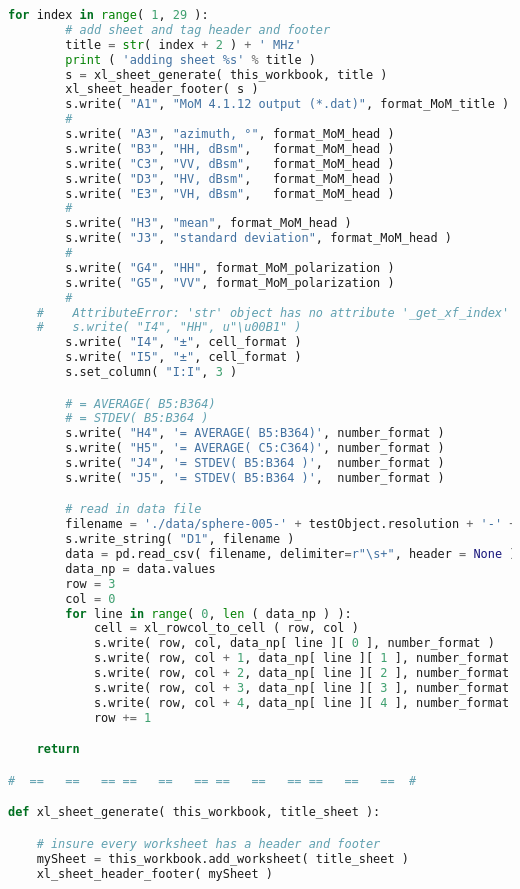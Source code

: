 {{\begin{lstlisting}[language=Python]
    for index in range( 1, 29 ):
        # add sheet and tag header and footer
        title = str( index + 2 ) + ' MHz'
        print ( 'adding sheet %s' % title )
        s = xl_sheet_generate( this_workbook, title )
        xl_sheet_header_footer( s )
        s.write( "A1", "MoM 4.1.12 output (*.dat)", format_MoM_title )
        #
        s.write( "A3", "azimuth, °", format_MoM_head )
        s.write( "B3", "HH, dBsm",   format_MoM_head )
        s.write( "C3", "VV, dBsm",   format_MoM_head )
        s.write( "D3", "HV, dBsm",   format_MoM_head )
        s.write( "E3", "VH, dBsm",   format_MoM_head )
        #
        s.write( "H3", "mean", format_MoM_head )
        s.write( "J3", "standard deviation", format_MoM_head )
        #
        s.write( "G4", "HH", format_MoM_polarization )
        s.write( "G5", "VV", format_MoM_polarization )
        #
    #    AttributeError: 'str' object has no attribute '_get_xf_index'
    #    s.write( "I4", "HH", u"\u00B1" )
        s.write( "I4", "±", cell_format )
        s.write( "I5", "±", cell_format )
        s.set_column( "I:I", 3 )

        # = AVERAGE( B5:B364)
        # = STDEV( B5:B364 )
        s.write( "H4", '= AVERAGE( B5:B364)', number_format )
        s.write( "H5", '= AVERAGE( C5:C364)', number_format )
        s.write( "J4", '= STDEV( B5:B364 )',  number_format )
        s.write( "J5", '= STDEV( B5:B364 )',  number_format )

        # read in data file
        filename = './data/sphere-005-' + testObject.resolution + '-' + str( index + 2 ).zfill(2) + '.4112.dat.txt'
        s.write_string( "D1", filename )
        data = pd.read_csv( filename, delimiter=r"\s+", header = None )
        data_np = data.values
        row = 3
        col = 0
        for line in range( 0, len ( data_np ) ):
            cell = xl_rowcol_to_cell ( row, col )
            s.write( row, col, data_np[ line ][ 0 ], number_format )
            s.write( row, col + 1, data_np[ line ][ 1 ], number_format )
            s.write( row, col + 2, data_np[ line ][ 2 ], number_format )
            s.write( row, col + 3, data_np[ line ][ 3 ], number_format )
            s.write( row, col + 4, data_np[ line ][ 4 ], number_format )
            row += 1

    return

#  ==   ==   == ==   ==   == ==   ==   == ==   ==   ==  #

def xl_sheet_generate( this_workbook, title_sheet ):

    # insure every worksheet has a header and footer
    mySheet = this_workbook.add_worksheet( title_sheet )
    xl_sheet_header_footer( mySheet )


\end{lstlisting}}}

